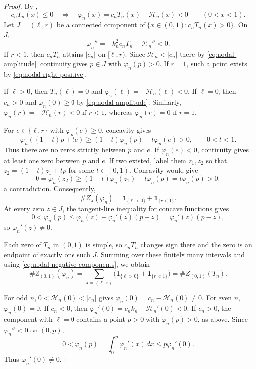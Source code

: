 \documentclass[11pt]{amsart}
\numberwithin{equation}{section}
\theoremstyle{remark}
\newcommand{\one}{\mathbf 1}
\begin{document}
\begin{proof}
By ,
\begin{equation}\label{eq:nodal-negative-components}
 c_nT_n(x)\le0\quad\Longrightarrow\quad
 \varphi_n(x)=c_nT_n(x)-\mathcal H_n(x)<0\qquad(0<x<1).
\end{equation}
Let $J=(\ell,r)$ be a connected component of
$\{x\in(0,1):c_nT_n(x)>0\}$. On $J$,
\begin{equation}\label{eq:nodal-strict-concavity}
 \varphi_n''=-k_n^2c_nT_n-\mathcal H_n''<0.
\end{equation}
If $r<1$, then $c_nT_n$ attains $|c_n|$ on $[\ell,r)$.
Since $\mathcal H_n<|c_n|$ there by \eqref{eq:nodal-amplitude},
continuity gives $p\in J$ with $\varphi_n(p)>0$.
If $r=1$, such a point exists by \eqref{eq:nodal-right-positive}.

If $\ell>0$, then $T_n(\ell)=0$ and
$\varphi_n(\ell)=-\mathcal H_n(\ell)<0$.
If $\ell=0$, then $c_n>0$ and $\varphi_n(0)\ge0$
by \eqref{eq:nodal-amplitude}.
Similarly, $\varphi_n(r)=-\mathcal H_n(r)<0$ if $r<1$,
whereas $\varphi_n(r)=0$ if $r=1$.

For $e\in\{\ell,r\}$ with $\varphi_n(e)\ge0$, concavity gives
\[
 \varphi_n((1-t)p+te)
 \ge(1-t)\varphi_n(p)+t\varphi_n(e)>0,
 \qquad 0<t<1.
\]
Thus there are no zeros strictly between $p$ and $e$.
If $\varphi_n(e)<0$, continuity gives at least one zero between
$p$ and $e$. If two existed, label them $z_1,z_2$ so that
$z_2=(1-t)z_1+tp$ for some $t\in(0,1)$. Concavity would give
\[
 0=\varphi_n(z_2)
 \ge(1-t)\varphi_n(z_1)+t\varphi_n(p)
 =t\varphi_n(p)>0,
\]
a contradiction. Consequently,
\[
 \#Z_J(\varphi_n)=\one_{\{\ell>0\}}+\one_{\{r<1\}}.
\]
At every zero $z\in J$, the tangent-line inequality for concave functions gives
\begin{equation}\label{eq:nodal-derivative-sign}
 0<\varphi_n(p)
 \le\varphi_n(z)+\varphi_n'(z)(p-z)
 =\varphi_n'(z)(p-z),
\end{equation}
so $\varphi_n'(z)\ne0$.

Each zero of $T_n$ in $(0,1)$ is simple, so $c_nT_n$ changes sign
there and the zero is an endpoint of exactly one such $J$.
Summing over these finitely many intervals and using
\eqref{eq:nodal-negative-components}, we obtain
\begin{equation}\label{eq:nodal-count-sum}
 \#Z_{(0,1)}(\varphi_n)
 =\sum_{J=(\ell,r)}
   \bigl(\one_{\{\ell>0\}}+\one_{\{r<1\}}\bigr)
 =\#Z_{(0,1)}(T_n).
\end{equation}

For odd $n$, $0<\mathcal H_n(0)<|c_n|$ gives
$\varphi_n(0)=c_n-\mathcal H_n(0)\ne0$.
For even $n$, $\varphi_n(0)=0$.
If $c_n<0$, then
$\varphi_n'(0)=c_nk_n-\mathcal H_n'(0)<0$.
If $c_n>0$, the component with $\ell=0$ contains a point $p>0$
with $\varphi_n(p)>0$, as above. Since $\varphi_n''<0$ on $(0,p)$,
\[
 0<\varphi_n(p)=\int_0^p\varphi_n'(x)\,dx
 \le p\varphi_n'(0).
\]
Thus $\varphi_n'(0)\ne0$.
\end{proof}
\end{document}

